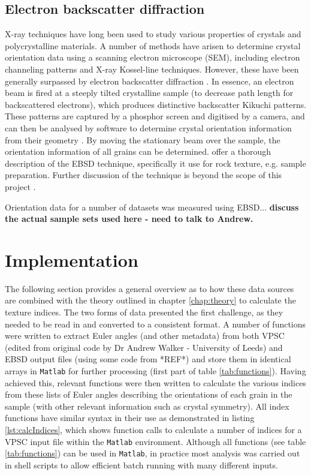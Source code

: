 \documentclass[a4paper,12pt]{report}
\numberwithin{equation}{chapter}
\begin{document}
\subsection{Electron backscatter diffraction}
X-ray techniques have long been used to study various properties of crystals and polycrystalline materials. A number of methods have arisen to determine crystal orientation data using a scanning electron microscope (SEM), including electron channeling patterns and X-ray Kossel-line techniques. However, these have been generally surpassed by electron backscatter diffraction \citep[EBSD or backscatter Kikuchi diffraction,][]{Harland1973}.  In essence, an electron beam is fired at a steeply tilted crystalline sample (to decrease path length for backscattered electrons), which produces distinctive backscatter Kikuchi patterns. These patterns are captured by a phosphor screen and digitised by a camera, and can then be analysed by software to determine crystal orientation information from their geometry  \citep{Zaefferer2007}. By moving the stationary beam over the sample, the orientation information of all grains can be determined. \cite{Prior1999} offer a thorough description of the EBSD technique, specifically it use for rock texture, e.g. sample preparation. Further discussion of the technique is beyond the scope of this project \citep[see][]{Schwarzer1997,Randle2000}.    

Orientation data for a number of datasets was measured using EBSD... \textbf{discuss the actual sample sets used here - need to talk to Andrew.}    

\section{Implementation}
The following section provides a general overview as to how these data sources are combined with the theory outlined in chapter \ref{chap:theory} to calculate the texture indices. The two forms of data presented the first challenge, as they needed to be read in and converted to a consistent format. A number of functions were written to extract Euler angles (and other metadata) from both VPSC (edited from original code by Dr Andrew Walker - University of Leeds) and EBSD output files (using some code from *REF*) and store them in identical arrays in \texttt{Matlab} for further processing (first part of table \ref{tab:functions}). Having achieved this, relevant functions were then written to calculate the various indices from these lists of Euler angles describing the orientations of each grain in the sample (with other relevant information such as crystal symmetry). All index functions have similar syntax in their use as demonstrated in listing \ref{lst:calcIndices}, which shows function calls to calculate a number of indices for a VPSC input file within the \texttt{Matlab} environment. Although all functions (see table \ref{tab:functions}) can be used in \texttt{Matlab}, in practice most analysis was carried out in shell scripts to allow efficient batch running with many different inputs.   
\end{document}
